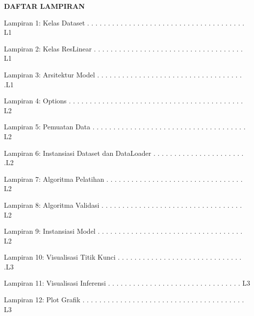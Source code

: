 \newpage %
\begin{center}
    \begin{large}\textbf{DAFTAR LAMPIRAN}\\\end{large}
\end{center}
\vspace{5mm}
\noindent Lampiran 1: Kelas Dataset
. . . . . . . . . . . . . . . . . . . . . . . . . . . . . . . . . . . . . . L1

\noindent Lampiran 2: Kelas ResLinear
. . . . . . . . . . . . . . . . . . . . . . . . . . . . . . . . . . . . L1

\noindent Lampiran 3: Arsitektur Model
. . . . . . . . . . . . . . . . . . . . . . . . . . . . . . . . . . . .L1

\noindent Lampiran 4: Options
. . . . . . . . . . . . . . . . . . . . . . . . . . . . . . . . . . . . . . . . . . L2

\noindent Lampiran 5: Pemuatan Data
. . . . . . . . . . . . . . . . . . . . . . . . . . . . . . . . . . . . . L2

\noindent Lampiran 6: Instansiasi Dataset dan DataLoader
. . . . . . . . . . . . . . . . . . . . . . .L2

\noindent Lampiran 7: Algoritma Pelatihan
. . . . . . . . . . . . . . . . . . . . . . . . . . . . . . . . . L2

\noindent Lampiran 8: Algoritma Validasi
. . . . . . . . . . . . . . . . . . . . . . . . . . . . . . . . . . L2

\noindent Lampiran 9: Instansiasi Model
. . . . . . . . . . . . . . . . . . . . . . . . . . . . . . . . . . . L2

\noindent Lampiran 10: Visualisasi Titik Kunci
. . . . . . . . . . . . . . . . . . . . . . . . . . . . . . .L3

\noindent Lampiran 11: Visualisasi Inferensi
. . . . . . . . . . . . . . . . . . . . . . . . . . . . . . . . L3

\noindent Lampiran 12: Plot Grafik
. . . . . . . . . . . . . . . . . . . . . . . . . . . . . . . . . . . . . . . L3
